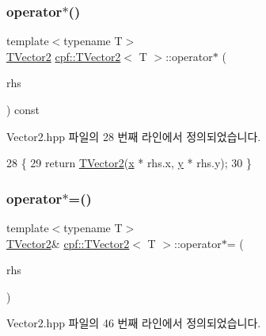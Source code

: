 \subsubsection{\texorpdfstring{operator$\ast$()}{operator*()}}
{\footnotesize\ttfamily template$<$typename T$>$ \\
\hyperlink{classcpf_1_1_t_vector2}{T\+Vector2} \hyperlink{classcpf_1_1_t_vector2}{cpf\+::\+T\+Vector2}$<$ T $>$\+::operator$\ast$ (\begin{DoxyParamCaption}\item[{const \hyperlink{classcpf_1_1_t_vector2}{T\+Vector2}$<$ T $>$ \&}]{rhs }\end{DoxyParamCaption}) const\hspace{0.3cm}{\ttfamily [inline]}}



Vector2.\+hpp 파일의 28 번째 라인에서 정의되었습니다.


\begin{DoxyCode}
28                                                       \{
29             \textcolor{keywordflow}{return} \hyperlink{classcpf_1_1_t_vector2_aaed071ed32aa0e7fb5d8dc15e65aa2e5}{TVector2}(\hyperlink{classcpf_1_1_t_vector2_a2c0ac9258353351f1435070a2307e9e1}{x} * rhs.x, \hyperlink{classcpf_1_1_t_vector2_a727b923b39a876bbb13c810bcf6eecff}{y} * rhs.y);
30         \}
\end{DoxyCode}
\mbox{\label{classcpf_1_1_t_vector2_a4c58534c578f3361dda26c4c79613e0d}} 
\subsubsection{\texorpdfstring{operator$\ast$=()}{operator*=()}}
{\footnotesize\ttfamily template$<$typename T$>$ \\
\hyperlink{classcpf_1_1_t_vector2}{T\+Vector2}\& \hyperlink{classcpf_1_1_t_vector2}{cpf\+::\+T\+Vector2}$<$ T $>$\+::operator$\ast$= (\begin{DoxyParamCaption}\item[{const \hyperlink{classcpf_1_1_t_vector2}{T\+Vector2}$<$ T $>$ \&}]{rhs }\end{DoxyParamCaption})\hspace{0.3cm}{\ttfamily [inline]}}



Vector2.\+hpp 파일의 46 번째 라인에서 정의되었습니다.


